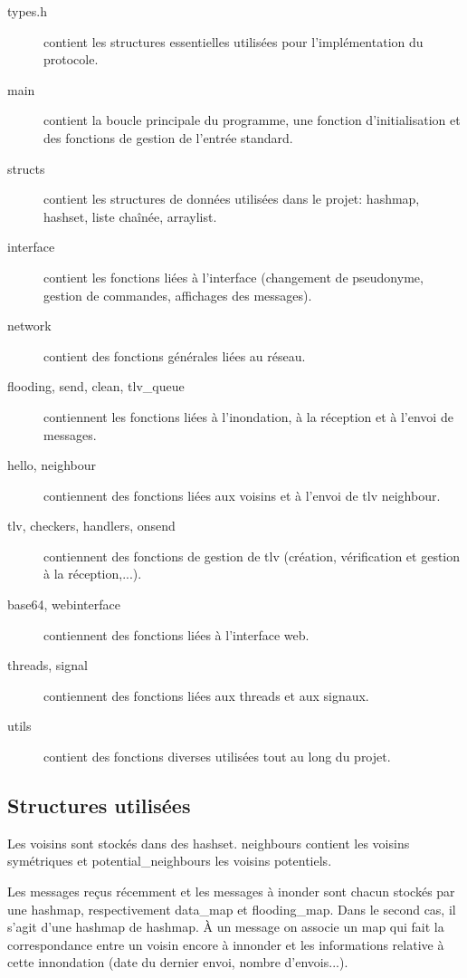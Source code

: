 \documentclass[a4paper,10pt]{article} %
\begin{document}
\begin{description}
\item[types.h] contient les structures essentielles utilisées pour l'implémentation du protocole.
\item[main] contient la boucle principale du programme, une fonction d'initialisation et des fonctions de gestion de l'entrée standard.
\item[structs] contient les structures de données utilisées dans le projet: hashmap, hashset, liste chaînée, arraylist.
\item[interface] contient les fonctions liées à l'interface (changement de pseudonyme, gestion de commandes, affichages des messages).
\item[network] contient des fonctions générales liées au réseau.
\item[flooding, send, clean, tlv\_queue] contiennent les fonctions liées à l'inondation, à la réception et à l'envoi de messages.
\item[hello, neighbour] contiennent des fonctions liées aux voisins et à l'envoi de tlv neighbour.
\item[tlv, checkers, handlers, onsend] contiennent des fonctions de gestion de tlv (création, vérification et gestion à la réception,...).
\item[base64, webinterface] contiennent des fonctions liées à l'interface web.
\item[threads, signal] contiennent des fonctions liées aux threads et aux signaux.
\item[utils] contient des fonctions diverses utilisées tout au long du projet.
\end{description}

\subsection{Structures utilisées\label{sec:struct}}
Les voisins sont stockés dans des hashset. \textrm{neighbours} contient les voisins symétriques et \textrm{potential\_neighbours} les voisins potentiels.

Les messages reçus récemment et les messages à inonder sont chacun stockés par une hashmap, respectivement \textrm{data\_map} et \textrm{flooding\_map}. Dans le second cas, il s'agit d'une hashmap de hashmap. À un message on associe un map qui fait la correspondance entre un voisin encore à innonder et les informations relative à cette innondation (date du dernier envoi, nombre d'envois...).
\end{document}
